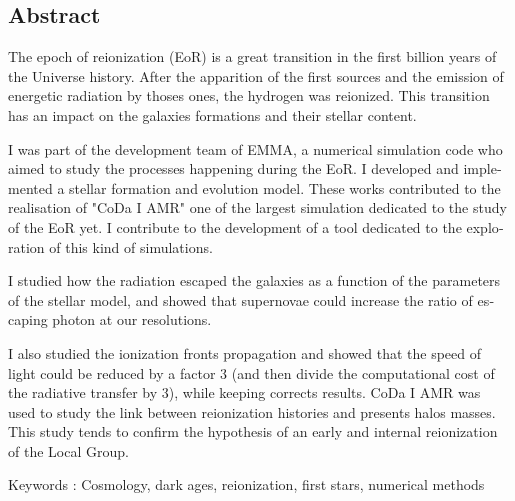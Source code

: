 \begin{otherlanguage}{english}
\chapter*{Abstract}
The epoch of reionization (EoR) is a great transition in the first billion years of the Universe history. 
After the apparition of the first sources and the emission of energetic radiation by thoses ones, the hydrogen was reionized. 
This transition has an impact on the galaxies formations and their stellar content.

I was part of the development team of EMMA, a numerical simulation code who aimed to study the  processes happening during the EoR. 
I developed and implemented a stellar formation and evolution model. 
These works contributed to the realisation of "CoDa I AMR" one of the largest simulation dedicated to the study of the EoR yet. 
I contribute to the development of a tool dedicated to the exploration of this kind of simulations.

I studied how the radiation escaped the galaxies as a function of the parameters of the stellar model, and showed that supernovae could increase the ratio of escaping photon at our resolutions.

I also studied the ionization fronts propagation and showed that the speed of light could be reduced by a factor 3 (and then divide the computational cost of the radiative transfer by 3), while keeping corrects results.
CoDa I AMR was used to study the link between reionization histories and presents halos masses.
This study tends to confirm the hypothesis of an early and internal reionization of the Local Group.

\vspace{0.5cm}

Keywords : Cosmology, dark ages, reionization, first stars, numerical methods
\end{otherlanguage}

\endgroup			

\vfill




